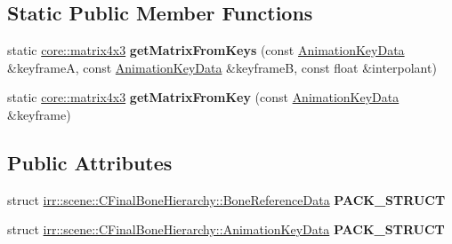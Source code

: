 \subsection*{Static Public Member Functions}
\begin{DoxyCompactItemize}
\item 
static \hyperlink{classirr_1_1core_1_1matrix4x3}{core\+::matrix4x3} {\bfseries get\+Matrix\+From\+Keys} (const \hyperlink{structirr_1_1scene_1_1CFinalBoneHierarchy_1_1AnimationKeyData}{Animation\+Key\+Data} \&keyframeA, const \hyperlink{structirr_1_1scene_1_1CFinalBoneHierarchy_1_1AnimationKeyData}{Animation\+Key\+Data} \&keyframeB, const float \&interpolant)\hypertarget{classirr_1_1scene_1_1CFinalBoneHierarchy_aad061460e833df60faf9bea74ddfca21}{}\label{classirr_1_1scene_1_1CFinalBoneHierarchy_aad061460e833df60faf9bea74ddfca21}

\item 
static \hyperlink{classirr_1_1core_1_1matrix4x3}{core\+::matrix4x3} {\bfseries get\+Matrix\+From\+Key} (const \hyperlink{structirr_1_1scene_1_1CFinalBoneHierarchy_1_1AnimationKeyData}{Animation\+Key\+Data} \&keyframe)\hypertarget{classirr_1_1scene_1_1CFinalBoneHierarchy_a685c4657b59edd2b32b8ce0632801293}{}\label{classirr_1_1scene_1_1CFinalBoneHierarchy_a685c4657b59edd2b32b8ce0632801293}

\end{DoxyCompactItemize}
\subsection*{Public Attributes}
\begin{DoxyCompactItemize}
\item 
struct \hyperlink{structirr_1_1scene_1_1CFinalBoneHierarchy_1_1BoneReferenceData}{irr\+::scene\+::\+C\+Final\+Bone\+Hierarchy\+::\+Bone\+Reference\+Data} {\bfseries P\+A\+C\+K\+\_\+\+S\+T\+R\+U\+CT}\hypertarget{classirr_1_1scene_1_1CFinalBoneHierarchy_ab0d7af1304027fb016201956eabcc871}{}\label{classirr_1_1scene_1_1CFinalBoneHierarchy_ab0d7af1304027fb016201956eabcc871}

\item 
struct \hyperlink{structirr_1_1scene_1_1CFinalBoneHierarchy_1_1AnimationKeyData}{irr\+::scene\+::\+C\+Final\+Bone\+Hierarchy\+::\+Animation\+Key\+Data} {\bfseries P\+A\+C\+K\+\_\+\+S\+T\+R\+U\+CT}\hypertarget{classirr_1_1scene_1_1CFinalBoneHierarchy_afc5d3887d08697790efda6abea2897d8}{}\label{classirr_1_1scene_1_1CFinalBoneHierarchy_afc5d3887d08697790efda6abea2897d8}

\end{DoxyCompactItemize}
